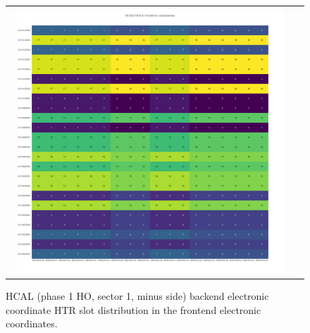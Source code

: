 \begin{figure}[htb]
 \begin{center}
  \begin{tabular}{cc}
   \includegraphics[angle=0,width=0.95\textwidth]{figures/appendix/HO1M_HTR_in_FrontEnd.png}
  \end{tabular}
  \caption{HCAL (phase 1 HO, sector 1, minus side) backend electronic coordinate HTR slot distribution in the frontend electronic coordinates.}
  \label{fig:lmapHO1MHTRFEC}
 \end{center}
\end{figure}
\clearpage

